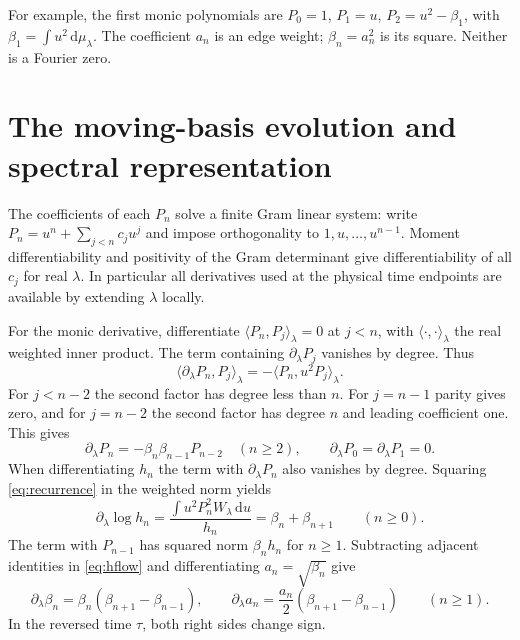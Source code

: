 \documentclass[11pt]{article}
\numberwithin{equation}{section}
\newcommand{\dd}{\mathrm d}
\begin{document}
For example, the first monic polynomials are
\(P_0=1\), \(P_1=u\), \(P_2=u^2-\beta_1\), with
\(\beta_1=\int u^2\,\dd\mu_\lambda\).
The coefficient \(a_n\) is an edge weight; \(\beta_n=a_n^2\)
is its square. Neither is a Fourier zero.

\section{The moving-basis evolution and spectral representation}
\label{sec:evolution}

The coefficients of each \(P_n\) solve a finite Gram linear system:
write \(P_n=u^n+\sum_{j<n}c_j u^j\) and impose orthogonality to
\(1,u,\ldots,u^{n-1}\). Moment differentiability and positivity of
the Gram determinant give differentiability of all \(c_j\) for real
\(\lambda\). In particular all derivatives used at the physical time
endpoints are available by extending \(\lambda\) locally.

For the monic derivative, differentiate
\(\langle P_n,P_j\rangle_\lambda=0\) at \(j<n\), with
\(\langle\cdot,\cdot\rangle_\lambda\) the real weighted inner product.
The term containing \(\partial_\lambda P_j\) vanishes by degree. Thus
\[
 \langle\partial_\lambda P_n,P_j\rangle_\lambda
    =-\langle P_n,u^2 P_j\rangle_\lambda.
\]
For \(j<n-2\) the second factor has degree less than \(n\).
For \(j=n-1\) parity gives zero, and for \(j=n-2\) the second
factor has degree \(n\) and leading coefficient one. This gives
\begin{equation}
 \partial_\lambda P_n=-\beta_n\beta_{n-1}P_{n-2}\quad(n\ge2),
 \qquad \partial_\lambda P_0=\partial_\lambda P_1=0 .
 \label{eq:monicvariation}
\end{equation}
When differentiating \(h_n\) the term with \(\partial_\lambda P_n\)
also vanishes by degree. Squaring \eqref{eq:recurrence} in the
weighted norm yields
\begin{equation}
 \partial_\lambda\log h_n
  =\frac{\int u^2P_n^2W_\lambda\,\dd u}{h_n}
  =\beta_n+\beta_{n+1}\qquad(n\ge0).
 \label{eq:hflow}
\end{equation}
The term with \(P_{n-1}\) has squared norm \(\beta_n h_n\)
for \(n\ge1\). Subtracting adjacent identities in \eqref{eq:hflow}
and differentiating \(a_n=\sqrt{\beta_n}\) give
\begin{equation}
 \partial_\lambda\beta_n=\beta_n(\beta_{n+1}-\beta_{n-1}),\qquad
 \partial_\lambda a_n=\frac{a_n}{2}(\beta_{n+1}-\beta_{n-1})
 \qquad(n\ge1).
 \label{eq:volterra}
\end{equation}
In the reversed time \(\tau\), both right sides change sign.
\end{document}
